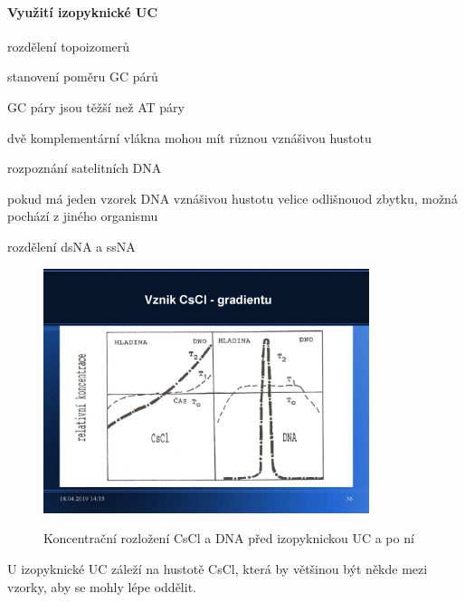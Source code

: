 \documentclass[DIV=8]{scrreprt}
\begin{document}
\paragraph{Využití izopyknické UC}
\begin{myItemize}[nosep]
    \item rozdělení topoizomerů
    \item stanovení poměru GC párů
\begin{myItemize}[nosep]
    \item GC páry jsou těžší než AT páry
    \item dvě komplementární vlákna mohou mít různou vznášivou hustotu
\end{myItemize}

    \item rozpoznání satelitních DNA
\begin{myItemize}[nosep]
    \item pokud má jeden vzorek DNA vznášivou hustotu velice odlišnouod zbytku, možná pochází z jiného organismu
\end{myItemize}

    \item rozdělení dsNA a ssNA
\end{myItemize}



\begin{figure}
    \caption{Koncentrační rozložení CsCl a DNA před izopyknickou UC a po ní}
    \includegraphics[width=0.85\textwidth]{slides-7/slide-34.jpg}
    \centering
    \label{}
\end{figure}


U izopyknické UC záleží na hustotě CsCl, která by většinou být někde mezi vzorky, aby se mohly lépe oddělit.
\end{document}

